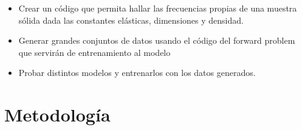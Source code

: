 \documentclass[12pt]{article}
\begin{document}

\begin{itemize}
	\item Crear un código que permita hallar las frecuencias propias de una muestra sólida dada las constantes elásticas, dimensiones y densidad.
	\item Generar grandes conjuntos de datos usando el código del forward problem que servirán de entrenamiento al modelo
	\item Probar distintos modelos y entrenarlos con los datos generados.
\end{itemize}

\section{Metodología}


\end{document}
